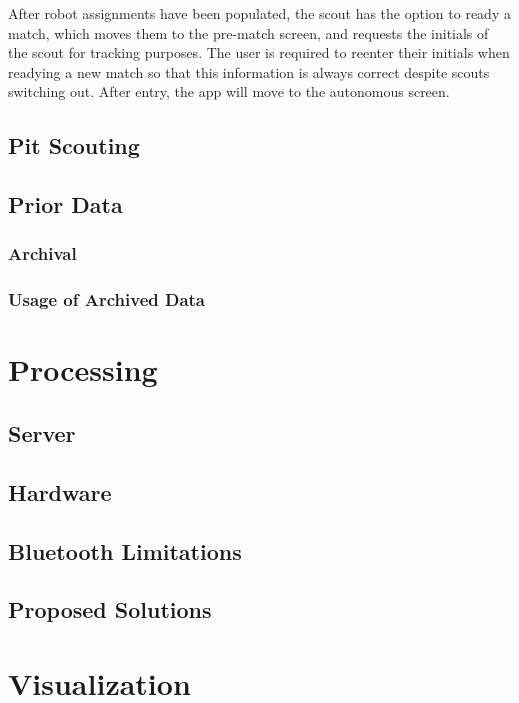 \documentclass[11pt]{report}
\begin{document}
After robot assignments have been populated, the scout has the option to ready a match, which moves them to the pre-match screen, and requests the initials of the scout for tracking purposes. The user is required to reenter their initials when readying a new match so that this information is always correct despite scouts switching out. After entry, the app will move to the autonomous screen.


\subsection{Pit Scouting}
\subsection{Prior Data}
\subsubsection{Archival}
\subsubsection{Usage of Archived Data}


\section{Processing}
\subsection {Server}
\subsection{Hardware}
\subsection{Bluetooth Limitations}
\subsection{Proposed Solutions}


\section{Visualization}
\label{sec:visualization}
\end{document}
